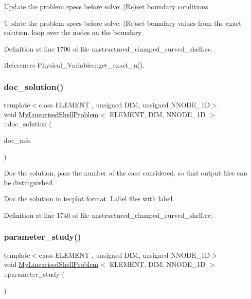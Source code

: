 Update the problem specs before solve\+: (Re)set boundary conditions. 

Update the problem specs before solve\+: (Re)set boundary values from the exact solution. loop over the nodes on the boundary 

Definition at line 1700 of file unstructured\+\_\+clamped\+\_\+curved\+\_\+shell.\+cc.



References Physical\+\_\+\+Variables\+::get\+\_\+exact\+\_\+u().

\mbox{\label{classMyLinearisedShellProblem_a5894d8fae239fd5255b6a661cbc23fa5}} 
\subsubsection{\texorpdfstring{doc\+\_\+solution()}{doc\_solution()}}
{\footnotesize\ttfamily template$<$class E\+L\+E\+M\+E\+NT , unsigned D\+IM, unsigned N\+N\+O\+D\+E\+\_\+1D$>$ \\
void \hyperlink{classMyLinearisedShellProblem}{My\+Linearised\+Shell\+Problem}$<$ E\+L\+E\+M\+E\+NT, D\+IM, N\+N\+O\+D\+E\+\_\+1D $>$\+::doc\+\_\+solution (\begin{DoxyParamCaption}\item[{Doc\+Info \&}]{doc\+\_\+info }\end{DoxyParamCaption})}



Doc the solution, pass the number of the case considered, so that output files can be distinguished. 

Doc the solution in tecplot format. Label files with label. 

Definition at line 1740 of file unstructured\+\_\+clamped\+\_\+curved\+\_\+shell.\+cc.

\mbox{\label{classMyLinearisedShellProblem_ab9255e3cbaae69ad5d61757d891b633e}} 
\subsubsection{\texorpdfstring{parameter\+\_\+study()}{parameter\_study()}}
{\footnotesize\ttfamily template$<$class E\+L\+E\+M\+E\+NT , unsigned D\+IM, unsigned N\+N\+O\+D\+E\+\_\+1D$>$ \\
void \hyperlink{classMyLinearisedShellProblem}{My\+Linearised\+Shell\+Problem}$<$ E\+L\+E\+M\+E\+NT, D\+IM, N\+N\+O\+D\+E\+\_\+1D $>$\+::parameter\+\_\+study (\begin{DoxyParamCaption}{ }\end{DoxyParamCaption})}



